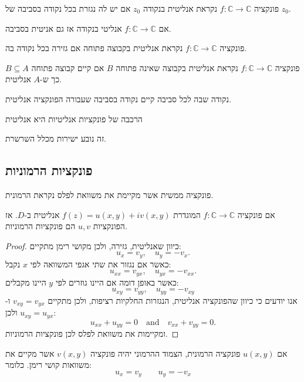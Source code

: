 \documentclass{tstextbook}
\begin{document}
\begin{definition}
פונקציה \(f:\mathbb{C}\to \mathbb{C}\) נקראת אנליטית בנקודה \(z_{0}\) אם יש לה נגזרת בכל נקודה בסביבה של \(z_{0}\).

\end{definition}
\begin{corollary}
אם \(f:\mathbb{C}\to\mathbb{C}\) אנליטי בנקודה אז גם אניטית בסביבה.

\end{corollary}
\begin{definition}
פונקציה \(f:\mathbb{C}\to \mathbb{C}\) נקראת אנליטית בקבוצה פתוחה אם גזירה בכל נקודה בה.

\end{definition}
\begin{definition}
פונקציה \(f:\mathbb{C}\to \mathbb{C}\) נקראת אנליטית בקבוצה שאינה פתוחה \(B\) אם קיים קבוצה פתוחה \(B\subseteq A\) כך ש-\(A\) אנליטית.

\end{definition}
\begin{definition}
נקודה שבה לכל סביבה קיים נקודה בסביבה שעבורה הפונקציה אנליטית.

\end{definition}
\begin{proposition}
הרכבה של פונקציות אנליטיות היא אנליטית

\end{proposition}
זה נובע ישירות מכלל השרשרת.

\subsection{פונקציות הרמוניות}

\begin{definition}
פונקציה ממשית אשר מקיימת את משוואת לפלס נקראת הרמונית.

\end{definition}
\begin{theorem}
אם פונקציה \(f:\mathbb{C}\to \mathbb{C}\) המוגדרת \(f(z)=u(x,y)+iv(x,y)\) אנליטית ב-\(D\). אז הפונקציות \(u,v\) הם פונקציות הרמוניות.

\end{theorem}
\begin{proof}
כיוון שאנליטית, גזירה, ולכן מקושי רימן מתקיים:
$$u_{x}=v_{y},\quad u_{y}=-v_{x}.$$
כאשר אם נגזור את שתי אגפי המשוואה לפי \(x\) נקבל:
$$u_{x x}=v_{y x},\quad u_{y x}=-v_{x x}.$$
כאשר באופן דומה אם היינו גוזרים לפי \(y\) היינו מקבלים:
$$u_{x y}=v_{y y},\quad u_{y y}=-v_{x y}$$
אנו יודעים כי כיוון שהפונקציה אנליטית, הנגזרות החלקיות רציפות, ולכן מתקיים \(v_{xy}=v_{yx}\) ו-\(u_{xy}=u_{yx}\) ולכן:
$$u_{x x}+u_{y y}=0\quad{\mathrm{and}}\quad v_{x x}+v_{y y}=0.$$
ומקיימות את משוואת לפלס לכן פונקציות הרמוניות.

\end{proof}
\begin{definition}
אם \(u(x,y)\) פונקציה הרמונית, הצמוד ההרמוני יהיה פונקציה \(v(x,y)\) אשר מקיים את משוואות קושי רימן. כלומר:
$$u_{x}=v_{y}\qquad u_{y}=-v_{x}$$

\end{definition}
\end{document}
